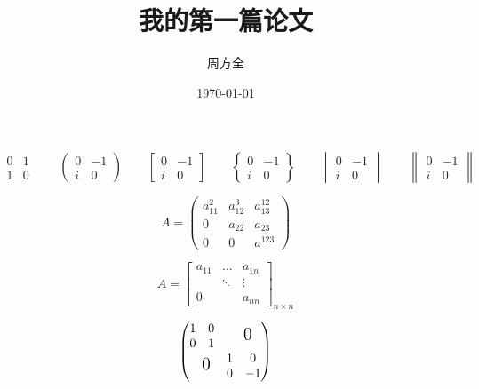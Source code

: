 \documentclass{ctexart} %
\title{\heiti 我的第一篇论文}
\author{\kaishu 周方全}
\date{\today}
\begin{document}
	\maketitle
	
	
	\[
	\begin{matrix}
	    0 & 1 \\
	    1 & 0 
	\end{matrix} \qquad
	\begin{pmatrix}
		0 & -1 \\
		i & 0
	\end{pmatrix} \qquad
	\begin{bmatrix}
	0 & -1 \\
	i & 0
	\end{bmatrix} \qquad
	\begin{Bmatrix}
	0 & -1 \\
	i & 0
	\end{Bmatrix} \qquad
	\begin{vmatrix}
	0 & -1 \\
	i & 0
	\end{vmatrix} \qquad
	\begin{Vmatrix}
	0 & -1 \\
	i & 0
	\end{Vmatrix}	
	\]
	
	\[
	A = \begin{pmatrix}
		a_{11}^2 & a_{12}^3 & a_{13}^{12} \\
		0 & a_{22} & a_{23} \\
		0 & 0 & a^{123}
	\end{pmatrix}
	\]
	
	\[
	A = \begin{bmatrix}
		a_{11} & \dots & a_{1n} \\
		& \ddots & \vdots \\
		0 & & a_{nn}
	\end{bmatrix}_{n \times n}
	\]
	
	\[
	\begin{pmatrix}
		\begin{matrix}
			1 & 0 \\ 0 & 1
		\end{matrix}
		& \text{\Large 0} \\
		
		\text{\Large 0} & 
		\begin{matrix}
			1 & 0 \\ 0 & -1
		\end{matrix}
	\end{pmatrix}
	\]
	
\end{document}
